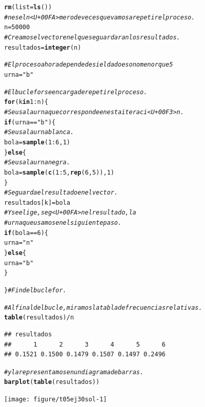 \documentclass[10pt,a4paper]{article}\usepackage[]{graphicx}\usepackage[]{color}
\makeatletter
\newcommand{\hlnum}[1]{\textcolor[rgb]{0.686,0.059,0.569}{#1}}%
\newcommand{\hlstr}[1]{\textcolor[rgb]{0.192,0.494,0.8}{#1}}%
\newcommand{\hlcom}[1]{\textcolor[rgb]{0.678,0.584,0.686}{\textit{#1}}}%
\newcommand{\hlopt}[1]{\textcolor[rgb]{0,0,0}{#1}}%
\newcommand{\hlstd}[1]{\textcolor[rgb]{0.345,0.345,0.345}{#1}}%
\newcommand{\hlkwa}[1]{\textcolor[rgb]{0.161,0.373,0.58}{\textbf{#1}}}%
\newcommand{\hlkwb}[1]{\textcolor[rgb]{0.69,0.353,0.396}{#1}}%
\newcommand{\hlkwc}[1]{\textcolor[rgb]{0.333,0.667,0.333}{#1}}%
\newcommand{\hlkwd}[1]{\textcolor[rgb]{0.737,0.353,0.396}{\textbf{#1}}}%
\newenvironment{kframe}{%
 \def\at@end@of@kframe{}%
 \ifinner\ifhmode%
  \def\at@end@of@kframe{\end{minipage}}%
  \begin{minipage}{\columnwidth}%
 \fi\fi%
 \def\FrameCommand##1{\hskip\@totalleftmargin \hskip-\fboxsep
 \colorbox{shadecolor}{##1}\hskip-\fboxsep
     \hskip-\linewidth \hskip-\@totalleftmargin \hskip\columnwidth}%
 \MakeFramed {\advance\hsize-\width
   \@totalleftmargin\z@ \linewidth\hsize
   \@setminipage}}%
 {\par\unskip\endMakeFramed%
 \at@end@of@kframe}
\newenvironment{knitrout}{}{} %
\makeatother
\begin{document}
\begin{knitrout}
\color{fgcolor}\begin{kframe}
\begin{alltt}
\hlkwd{rm}\hlstd{(}\hlkwc{list}\hlstd{=}\hlkwd{ls}\hlstd{())}
\hlcom{# n es el n<U+00FA>mero de veces que vamos a repetir el proceso.}
\hlstd{n} \hlkwb{=} \hlnum{50000}
\hlcom{# Creamos el vector en el que se guardaran los resultados.}
\hlstd{resultados} \hlkwb{=} \hlkwd{integer}\hlstd{(n)}

\hlcom{# El proceso ahora depende de si el dado es o no menor que 5}
\hlstd{urna} \hlkwb{=} \hlstr{"b"}

\hlcom{# El bucle for se encarga de repetir el proceso.}
\hlkwa{for}\hlstd{(k} \hlkwa{in} \hlnum{1}\hlopt{:}\hlstd{n)\{}
    \hlcom{# Se usa la urna que corresponde en esta iteraci<U+00F3>n.}
    \hlkwa{if}\hlstd{(urna} \hlopt{==} \hlstr{"b"}\hlstd{)\{}
        \hlcom{#Se usa la urna blanca.}
        \hlstd{bola} \hlkwb{=} \hlkwd{sample}\hlstd{(}\hlnum{1}\hlopt{:}\hlnum{6}\hlstd{,} \hlnum{1}\hlstd{)}
    \hlstd{\}} \hlkwa{else} \hlstd{\{}
        \hlcom{#Se usa la urna negra.}
        \hlstd{bola} \hlkwb{=} \hlkwd{sample}\hlstd{(}\hlkwd{c}\hlstd{(}\hlnum{1}\hlopt{:}\hlnum{5}\hlstd{,} \hlkwd{rep}\hlstd{(}\hlnum{6}\hlstd{,}\hlnum{5}\hlstd{)),} \hlnum{1}\hlstd{)}
    \hlstd{\}}
    \hlcom{# Se guarda el resultado en el vector.}
    \hlstd{resultados[k]} \hlkwb{=} \hlstd{bola}
    \hlcom{# Y se elige, seg<U+00FA>n el resultado, la}
    \hlcom{# urna que usamos en el siguiente paso.}
    \hlkwa{if}\hlstd{(bola} \hlopt{==} \hlnum{6}\hlstd{)\{}
        \hlstd{urna} \hlkwb{=} \hlstr{"n"}
    \hlstd{\}} \hlkwa{else} \hlstd{\{}
        \hlstd{urna} \hlkwb{=} \hlstr{"b"}
    \hlstd{\}}

\hlstd{\}} \hlcom{# Fin del bucle for.}

\hlcom{# Al final del bucle, miramos la tabla de frecuencias relativas.}
\hlkwd{table}\hlstd{(resultados)} \hlopt{/} \hlstd{n}
\end{alltt}
\begin{verbatim}
## resultados
##      1      2      3      4      5      6 
## 0.1521 0.1500 0.1479 0.1507 0.1497 0.2496
\end{verbatim}
\begin{alltt}
\hlcom{# y la representamos en un diagrama de barras.}
\hlkwd{barplot}\hlstd{(}\hlkwd{table}\hlstd{(resultados))}
\end{alltt}
\end{kframe}
\texttt{[image: figure/t05ej30sol-1]} 

\end{knitrout}
\end{document}
